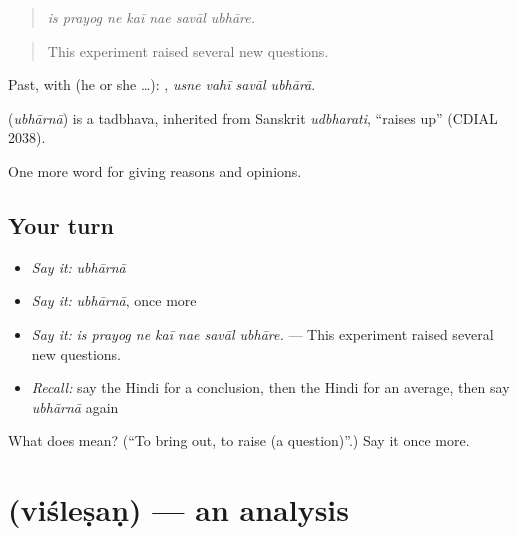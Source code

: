 \begin{quote}
      
\end{quote}

\begin{quote}
\emph{is prayog ne kaī nae savāl ubhāre.}
\end{quote}

\begin{quote}
This experiment raised several new questions.
\end{quote}

Past, with  (he or she …):    , \emph{usne vahī savāl ubhārā}.

\begin{cousinweb}
\textbf{} (\emph{ubhārnā}) is a tadbhava, inherited from Sanskrit \emph{udbharati}, \textquotedblleft{}raises up\textquotedblright{} (CDIAL 2038).
\end{cousinweb}

\begin{grammarlens}[title={What you've built}]
One more word for giving reasons and opinions.
\end{grammarlens}

\subsection*{Your turn}
\begin{itemize}
\raggedright
  \item \emph{Say it:} \emph{ubhārnā}
  \item \emph{Say it:} \emph{ubhārnā}, once more
  \item \emph{Say it:} \emph{is prayog ne kaī nae savāl ubhāre.} — This experiment raised several new questions.
  \item \emph{Recall:} say the Hindi for a conclusion, then the Hindi for an average, then say \emph{ubhārnā} again
\end{itemize}

\begin{tcolorbox}[breakable,colback=teal!4,colframe=teal!35!black,title={Before you move on}]
What does  mean? (\textquotedblleft{}To bring out, to raise (a question)\textquotedblright{}.) Say it once more.
\end{tcolorbox}
\section[\texorpdfstring{\hi{विश्लेषण} (viśleṣaṇ)}{विश्लेषण (viśleṣaṇ)}]{ (viśleṣaṇ) — an analysis}

